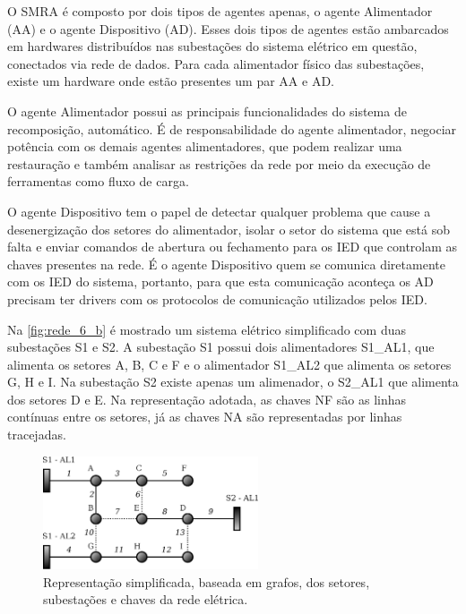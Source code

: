 \documentclass[journal]{IEEEtran}
\begin{document}
O SMRA é composto por dois tipos de agentes apenas, o agente Alimentador (AA) e o agente Dispositivo (AD). Esses dois tipos de agentes estão ambarcados em hardwares distribuídos nas subestações do sistema elétrico em questão, conectados via rede de dados. Para cada alimentador físico das subestações, existe um hardware onde estão presentes um par AA e AD.

O agente Alimentador possui as principais funcionalidades do sistema de recomposição, automático. É de responsabilidade do agente alimentador, negociar potência com os demais agentes alimentadores, que podem realizar uma restauração e também analisar as restrições da rede por meio da execução de ferramentas como fluxo de carga.

O agente Dispositivo tem o papel de detectar qualquer problema que cause a desenergização dos setores do alimentador, isolar o setor do sistema que está sob falta e enviar comandos de abertura ou fechamento para os IED que controlam as chaves presentes na rede. É o agente Dispositivo quem se comunica diretamente com os IED do sistema, portanto, para que esta comunicação aconteça os AD precisam ter drivers com os protocolos de comunicação utilizados pelos IED.

Na \autoref{fig:rede_6_b} é mostrado um sistema elétrico simplificado com duas subestações S1 e S2. A subestação S1 possui dois alimentadores S1\_AL1, que alimenta os setores A, B, C e F e o alimentador S1\_AL2 que alimenta os setores G, H e I. Na subestação S2 existe apenas um alimenador, o S2\_AL1 que alimenta dos setores D e E. Na representação adotada, as chaves NF são as linhas contínuas entre os setores, já as chaves NA são representadas por linhas tracejadas.

\begin{figure}[htb]
    \centering
    
    \includegraphics[width=2.5in]{Figuras/rede_estado_normal.eps}

    \caption{\label{fig:rede_6_b} Representação simplificada, baseada em grafos, dos setores, subestações e chaves da rede elétrica.}
\end{figure}
\end{document}
